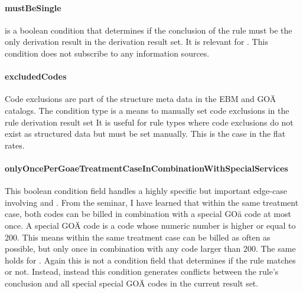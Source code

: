 \paragraph{mustBeSingle}
 is a boolean condition that determines if the conclusion of the rule must be the only derivation result in the derivation result set.
It is relevant for .
This condition does not subscribe to any information sources.

\paragraph{excludedCodes}
Code exclusions are part of the structure meta data in the EBM and GOÄ catalogs.
The \excludedCodes condition type is a means to manually set code exclusions in the rule derivation result set
It is useful for rule types where code exclusions do not exist as structured data but must be set manually.
This is the case in the flat rates.

\paragraph{onlyOncePerGoaeTreatmentCaseInCombinationWithSpecialServices}
This boolean condition field handles a highly specific but important edge-case involving  and .
From the \PVC seminar, I have learned that within the same treatment case, both codes can be billed in combination with a special GOä code at most once.
A special GOÄ code is a code whose numeric number is higher or equal to 200.
This means within the same treatment case  can be billed as often as possible, but only once in combination with any code larger than 200.
The same holds for .
Again this is not a condition field that determines if the rule matches or not.
Instead, instead this condition generates conflicts between the rule's conclusion and all special special GOÄ codes in the current result set.
